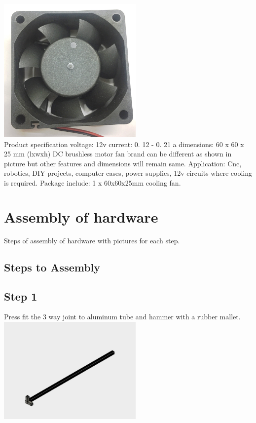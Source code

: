 \documentclass[a4paper,12pt,oneside]{book}
\begin{document}
\begin{itemize}
\begin{enumerate}
  \includegraphics[width=200pt]{Fan60x60x25}\\
  Product specification voltage: 12v current: 0. 12 - 0. 21 a dimensions: 60 x 60 x 25 mm (lxwxh) DC brushless motor fan brand can be different as shown in picture but other features and dimensions will remain same. Application: Cnc, robotics, DIY projects, computer cases, power supplies, 12v circuits where cooling is required. Package include: 1 x 60x60x25mm cooling fan.
  \end{enumerate}
\end{itemize}


\section{Assembly of hardware}
Steps of assembly of hardware with pictures for each step.
\subsection*{Steps to Assembly}
\subsection*{Step 1}
Press fit the 3 way joint to aluminum tube and hammer with a rubber mallet.\\
\includegraphics[width=200pt]{1}
\end{document}
